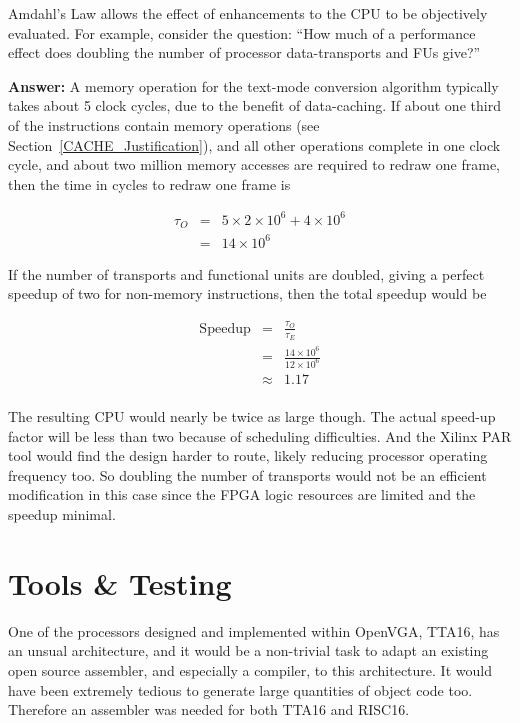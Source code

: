 Amdahl's Law allows the effect of enhancements to the CPU to be objectively
evaluated. For example, consider the question: ``How much of a performance effect
does doubling the number of processor data-transports and FUs give?''

\begin{flushleft}\textbf{Answer:} A memory operation for the text-mode conversion
algorithm typically takes about 5 clock cycles, due to the benefit of
data-caching. If about one third of the instructions contain memory operations
(see Section~\ref{CACHE_Justification}), and all other operations complete in one
clock cycle, and about two million memory accesses are required to redraw one
frame, then the time in cycles to redraw one frame is

\begin{eqnarray*}
\tau_O	& = & 5 \times 2\times10^6 + 4\times10^6 \\
		& = & 14\times10^6
\end{eqnarray*}

If the number of transports and functional units are doubled, giving a perfect
speedup of two for non-memory instructions, then the total speedup would be

\begin{eqnarray*}
\mathrm{Speedup}	& = & \frac{\tau_O}{\tau_E}	\\
					& = & \frac{14\times10^6}{12\times10^6}	\\
					& \approx & 1.17	\\
\end{eqnarray*}
\end{flushleft}

The resulting CPU would nearly be twice as large though. The actual speed-up
factor will be less than two because of scheduling difficulties. And the Xilinx
PAR tool would find the design harder to route, likely reducing processor
operating frequency too. So doubling the number of transports would not be an
efficient modification in this case since the FPGA logic resources are limited
and the speedup minimal.


\section{Tools \& Testing}
One of the processors designed and implemented within OpenVGA, TTA16, has an
unsual architecture, and it would be a non-trivial task to adapt an existing open
source assembler, and especially a compiler, to this architecture. It would have
been extremely tedious to generate large quantities of object code too. Therefore
an assembler was needed for both TTA16 and RISC16.


